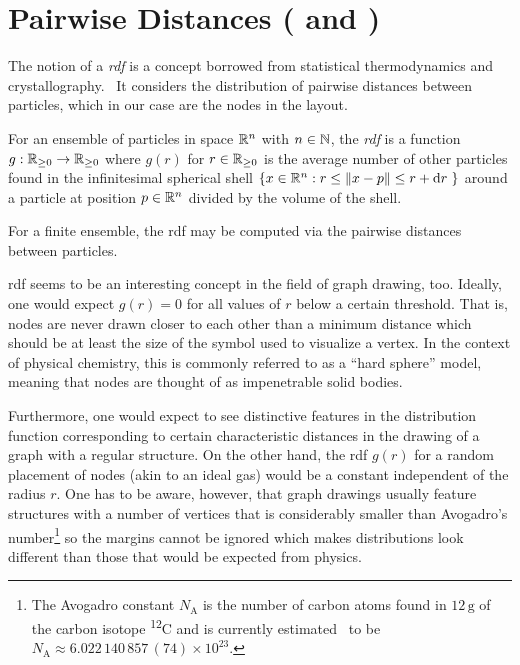 \documentclass{graphstudy}
\begin{document}
\section{Pairwise Distances ( and )}
\label{sec:rdf-global}
\label{sec:rdf-local}

The notion of a \emph{\ac{rdf}} is a concept borrowed from statistical thermodynamics and
crystallography.~\cite{Findenegg2015} It considers the distribution of pairwise distances between particles, which in
our case are the nodes in the layout.

\begin{definition}
  For an ensemble of particles in space \(\Reals^n\) with \(n\in\mathbb{N}\), the \emph{\acl{rdf}} is a function
  \(g:\RealsNN\to\RealsNN\) where \(g(r)\) for \(r\in\RealsNN\) is the average number of other particles found in the
  infinitesimal spherical shell \(\{\vec{x}\in\Reals^n\suchthat{r}\leq\vecnorm{\vec{x}-\vec{p}}\leq{r}+\diff{r}\}\)
  around a particle at position \(\vec{p}\in\Reals^n\) divided by the volume of the shell.
\end{definition}

For a finite ensemble, the \ac{rdf} may be computed via the pairwise distances between particles.

\Ac{rdf} seems to be an interesting concept in the field of graph drawing, too.  Ideally, one would expect \(g(r)=0\)
for all values of \(r\) below a certain threshold.  That is, nodes are never drawn closer to each other than a minimum
distance which should be at least the size of the symbol used to visualize a vertex.  In the context of physical
chemistry, this is commonly referred to as a \enquote{hard sphere} model, meaning that nodes are thought of as
impenetrable solid bodies.

Furthermore, one would expect to see distinctive features in the distribution function corresponding to certain
characteristic distances in the drawing of a graph with a regular structure.  On the other hand, the \ac{rdf} \(g(r)\)
for a random placement of nodes (akin to an ideal gas) would be a constant independent of the radius \(r\).  One has to
be aware, however, that graph drawings usually feature structures with a number of vertices that is considerably smaller
than Avogadro's number\footnote{%
  The Avogadro constant \(N_\mathrm{A}\) is the number of carbon atoms found in \(12\,\text{g}\) of the carbon isotope
  \mbox{\textsuperscript{12}C} and is currently estimated~\cite{NISTAvogadro} to be
  \(N_\mathrm{A}\approx6.022\,140\,857\,(74)\times10^{23}\).
}
so the margins cannot be ignored which makes distributions look different than those that would be expected from
physics.
\end{document}
